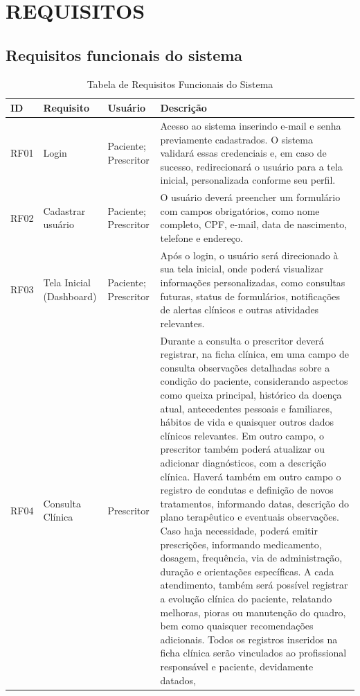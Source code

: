 \href{}{}\documentclass[12pt,portuguese,oneside]{article}
\begin{document}
\section{REQUISITOS}

\subsection{Requisitos funcionais do sistema}

\begin{table}[H]
\centering
\caption{Tabela de Requisitos Funcionais do Sistema}
\begin{tabularx}{\textwidth}{|>{\raggedright\arraybackslash}p{1cm}|>{\raggedright\arraybackslash}p{2.5cm}|>{\raggedright\arraybackslash}p{2cm}|>{\raggedright\arraybackslash}X|}
\hline
\rowcolor{gray!20}
\textbf{ID} & \textbf{Requisito} & \textbf{Usuário} & \textbf{Descrição}\\
\hline
RF01 & Login & Paciente; Prescritor & Acesso ao sistema inserindo e-mail e senha previamente cadastrados. O sistema validará essas credenciais e, em caso de sucesso, redirecionará o usuário para a tela inicial, personalizada conforme seu perfil.\\
\hline
RF02 & Cadastrar usuário & Paciente; Prescritor & O usuário deverá preencher um formulário com campos obrigatórios, como nome completo, CPF, e-mail, data de nascimento, telefone e endereço.\\
\hline
RF03 & Tela Inicial (Dashboard) & Paciente; Prescritor & Após o login, o usuário será direcionado à sua tela inicial, onde poderá visualizar informações personalizadas, como consultas futuras, status de formulários, notificações de alertas clínicos e outras atividades relevantes.\\
\hline
RF04 & Consulta Clínica & Prescritor & Durante a consulta o prescritor deverá registrar, na ficha clínica, em uma campo de consulta observações detalhadas sobre a condição do paciente, considerando aspectos como queixa principal, histórico da doença atual, antecedentes pessoais e familiares, hábitos de vida e quaisquer outros dados clínicos relevantes. Em outro campo, o prescritor também poderá atualizar ou adicionar diagnósticos, com a descrição clínica. Haverá também em outro campo o registro de condutas e definição de novos tratamentos, informando datas, descrição do plano terapêutico e eventuais observações. Caso haja necessidade, poderá emitir prescrições, informando medicamento, dosagem, frequência, via de administração, duração e orientações específicas. A cada atendimento, também será possível registrar a evolução clínica do paciente, relatando melhoras, pioras ou manutenção do quadro, bem como quaisquer recomendações adicionais. Todos os registros inseridos na ficha clínica serão vinculados ao profissional responsável e paciente, devidamente datados, \\
\hline
\end{tabularx}
\end{table}
\end{document}
